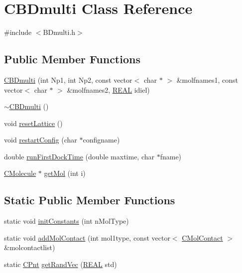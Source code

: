\hypertarget{classCBDmulti}{\section{C\-B\-Dmulti Class Reference}
\label{classCBDmulti}
}


{\ttfamily \#include $<$B\-Dmulti.\-h$>$}

\subsection*{Public Member Functions}
\begin{DoxyCompactItemize}
\item 
\hyperlink{classCBDmulti_a2091db088b9a6a1a6ec2b7c6c5d8996f}{C\-B\-Dmulti} (int Np1, int Np2, const vector$<$ char $\ast$ $>$ \&molfnames1, const vector$<$ char $\ast$ $>$ \&molfnames2, \hyperlink{util_8h_a5821460e95a0800cf9f24c38915cbbde}{R\-E\-A\-L} idiel)
\item 
\hyperlink{classCBDmulti_adab1c621face82806068b94f89d1417d}{$\sim$\-C\-B\-Dmulti} ()
\item 
void \hyperlink{classCBDmulti_a635ea038d73100f6945a69a7cfaf5f66}{reset\-Lattice} ()
\item 
void \hyperlink{classCBDmulti_ad3f1d4ade11ecb178d99125ba81fefe5}{restart\-Config} (char $\ast$configname)
\item 
double \hyperlink{classCBDmulti_a62bd0bcd8a4e060e63093d318f0b39c1}{run\-First\-Dock\-Time} (double maxtime, char $\ast$fname)
\item 
\hyperlink{classCMolecule}{C\-Molecule} $\ast$ \hyperlink{classCBDmulti_ae22be9dc35b7e0c97f778d917f12d56b}{get\-Mol} (int i)
\end{DoxyCompactItemize}
\subsection*{Static Public Member Functions}
\begin{DoxyCompactItemize}
\item 
static void \hyperlink{classCBDmulti_ab02b45910f422bc234e90ba4f5cfb7c3}{init\-Constants} (int n\-Mol\-Type)
\item 
static void \hyperlink{classCBDmulti_aa78e69e7897bef6e00108079323b3fb4}{add\-Mol\-Contact} (int mol1type, const vector$<$ \hyperlink{classCMolContact}{C\-Mol\-Contact} $>$ \&molcontactlist)
\item 
static \hyperlink{classCPnt}{C\-Pnt} \hyperlink{classCBDmulti_ae70695a83936614ba8b8ec9cd8f2728e}{get\-Rand\-Vec} (\hyperlink{util_8h_a5821460e95a0800cf9f24c38915cbbde}{R\-E\-A\-L} std)
\end{DoxyCompactItemize}
